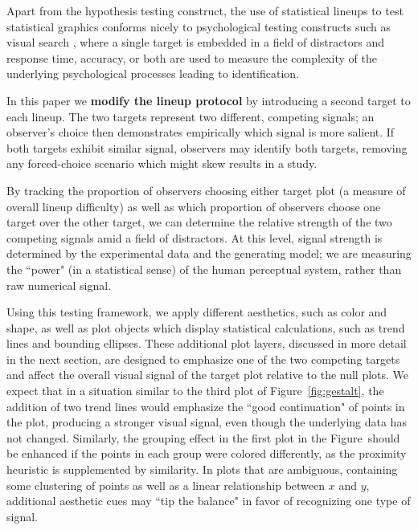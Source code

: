 \documentclass[12pt]{article}\usepackage[]{graphicx}\usepackage[]{color}
\newcommand{\comment}[2][inline]{\todo[color=SkyBlue, #1]{#2}} %
\begin{document}
Apart from the hypothesis testing construct, the use of statistical lineups to test statistical graphics conforms nicely to psychological testing constructs such as visual search \citep{demita1981validity,treisman1980feature}, where a single target is embedded in a field of distractors and response time, accuracy, or both are used to measure the complexity of the underlying psychological processes leading to identification. 


In this paper we {\bf modify the lineup protocol} by introducing a second target to each lineup. The two targets represent two different, competing signals; an observer's choice then demonstrates empirically which signal is more salient. 
If both targets exhibit similar signal, observers may identify both targets, removing any forced-choice scenario which might skew results in a study. %

By tracking the proportion of observers choosing either target plot (a measure of overall lineup difficulty) as well as which proportion of observers choose one target over the other target, we can determine the relative strength of the two competing signals amid a field of distractors. At this level, signal strength is determined by the experimental data and the generating model; we are measuring the ``power" (in a statistical sense) of the human perceptual system, rather than raw numerical signal. 

Using this testing framework, we  apply different aesthetics, such as color and shape, as well as plot objects which display statistical calculations, such as trend lines and bounding ellipses. These additional plot layers, discussed in more detail in the next section, are designed to emphasize one of the two competing targets and affect the overall visual signal of the target plot relative to the null plots. We expect that in a situation similar to the third plot of Figure~\ref{fig:gestalt}, the addition of two trend lines would emphasize the ``good continuation" of points in the plot, producing a stronger visual signal, even though the underlying data has not changed. Similarly, the grouping effect in the first plot in the Figure~should be enhanced if the points in each group were colored differently, as the proximity heuristic is supplemented by similarity. In plots that are ambiguous, containing some clustering of points as well as a linear relationship between $x$ and $y$, additional aesthetic cues may ``tip the balance" in favor of recognizing one type of signal.
\end{document}

